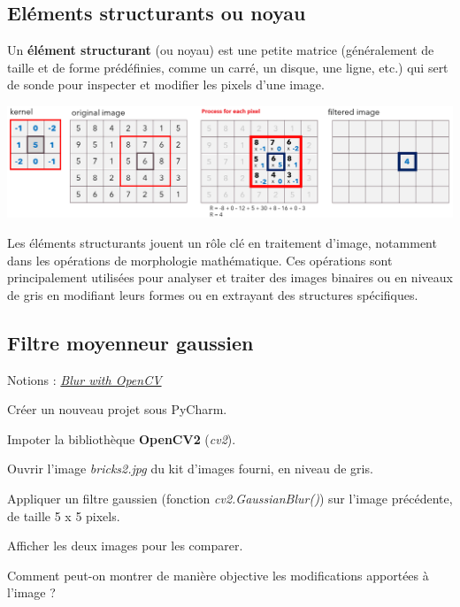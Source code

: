 \documentclass[a4paper,11pt,titlepage]{article} %
\begin{document}
\subsection{Eléments structurants ou noyau}

Un \textbf{élément structurant} (ou noyau) est une petite matrice (généralement de taille et de forme prédéfinies, comme un carré, un disque, une ligne, etc.) qui sert de sonde pour inspecter et modifier les pixels d'une image.  

\begin{center}
	\includegraphics[width=\textwidth]{images/kernel.png}
\end{center}

Les éléments structurants jouent un rôle clé en traitement d'image, notamment dans les opérations de morphologie mathématique. Ces opérations sont principalement utilisées pour analyser et traiter des images binaires ou en niveaux de gris en modifiant leurs formes ou en extrayant des structures spécifiques.


\subsection{Filtre moyenneur gaussien}

\begin{mdframed}[style=sidebar,frametitle={}]
Notions : \href{https://iogs-lense-training.github.io/image-processing/contents/opencv_blur.html#blur-with-opencv
}{\textit{Blur with OpenCV}}
\end{mdframed}

\Manip Créer un nouveau projet sous PyCharm.

\Manip Impoter la bibliothèque \textbf{OpenCV2} (\textit{cv2}).

\Manip Ouvrir l'image \textsl{bricks2.jpg} du kit d'images fourni, en niveau de gris.

\Manip Appliquer un filtre gaussien (fonction \textsl{cv2.GaussianBlur()}) sur l'image précédente, de taille 5 x 5 pixels.

\Manip Afficher les deux images pour les comparer.

\Quest Comment peut-on montrer de manière objective les modifications apportées à l'image ? 
\end{document}
